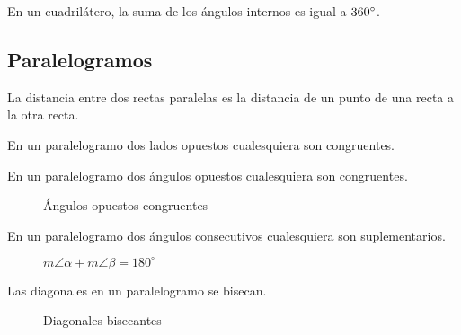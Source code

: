 \begin{theorem}
    En un cuadrilátero, la suma de los ángulos internos es igual a $360^{\circ}$.
\end{theorem}

\clearpage

\subsection{Paralelogramos}

    \begin{definition}
    La distancia entre dos rectas paralelas es la distancia de un punto de una recta a la otra recta.
\end{definition}

\begin{theorem}
    En un paralelogramo dos lados opuestos cualesquiera son congruentes.
\end{theorem}

\begin{theorem}
    En un paralelogramo dos ángulos opuestos cualesquiera son congruentes.
\end{theorem}

\begin{figure}[!h]
    \centering
    
    \caption{Ángulos opuestos congruentes}
    \label{fig:theorem10}
\end{figure}

\begin{theorem}
    En un paralelogramo dos ángulos consecutivos cualesquiera son suplementarios.

    \begin{figure}[!h]
        \centering
        
        \caption{$m\angle{\alpha} + m\angle{\beta} = 180^{\circ}$}
        \label{fig:theorem11}
    \end{figure}
    
\end{theorem}

\begin{theorem}
    Las diagonales en un paralelogramo se bisecan.

    \begin{figure}[!h]
        \centering
        
        \caption{Diagonales bisecantes}
        \label{fig:theorem12}
    \end{figure}
    
\end{theorem}

